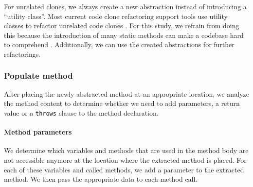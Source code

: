 For unrelated clones, we always create a new abstraction instead of introducing a ``utility class''. Most current code clone refactoring support tools use utility classes to refactor unrelated code clones \cite{mazinanian2016jdeodorant, yoshida2005refactoring, gode2010clone}. For this study, we refrain from doing this because the introduction of many static methods can make a codebase hard to comprehend \cite{xing2003pseudo}. Additionally, we can use the created abstractions for further refactorings.

\subsubsection{Populate method}
After placing the newly abstracted method at an appropriate location, we analyze the method content to determine whether we need to add parameters, a return value or a \texttt{throws} clause to the method declaration.

\paragraph{Method parameters}
We determine which variables and methods that are used in the method body are not accessible anymore at the location where the extracted method is placed. For each of these variables and called methods, we add a parameter to the extracted method. We then pass the appropriate data to each method call.


